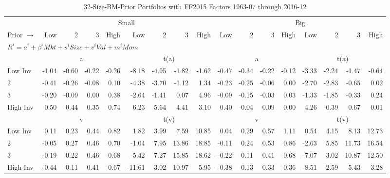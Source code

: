 
\begin{table}[!ht]
\centering
\caption{32-Size-BM-Prior Portfolios with FF2015 Factors 1963-07 through 2016-12}
\begin{tabular}{lrrrrrrrrrrrrrrrr}
  \toprule
    & \multicolumn{8}{c}{Small} & \multicolumn{8}{c}{Big} \\
      \cmidrule(r){2-9} \cmidrule(r){10-17}
    Prior $\rightarrow$ & Low & 2 & 3 & High & Low & 2 & 3 & High & Low & 2 & 3 & High & Low & 2 & 3 & High \\ 
  \midrule
  \multicolumn{17}{l}{$R^i=a^i+\beta^iMkt+s^iSize+v^iVal+m^iMom$} \\

  
    
      & \multicolumn{4}{c}{a} & \multicolumn{4}{c}{t(a)}
    
      & \multicolumn{4}{c}{a} & \multicolumn{4}{c}{t(a)}
    
    \\
      \cmidrule(r){2-5} \cmidrule(r){6-9} \cmidrule(r){10-13} \cmidrule(r){14-17}

    Low Inv   & -1.04  & -0.60  & -0.22  & -0.26  & -8.18  & -4.95  & -1.82  & -1.62  & -0.47  & -0.34  & -0.22  & -0.12  & -3.33  & -2.24  & -1.47  & -0.64  \\
           2  & -0.41  & -0.26  & -0.08  & 0.10  & -4.38  & -3.70  & -1.12  & 1.34  & -0.23  & -0.25  & -0.06  & 0.00  & -2.70  & -2.83  & -0.65  & 0.02  \\
           3  & -0.20  & -0.09  & 0.00  & 0.38  & -2.64  & -1.41  & 0.07  & 4.96  & -0.09  & -0.15  & -0.03  & 0.03  & -1.33  & -1.85  & -0.33  & 0.24  \\
    High Inv  & 0.50  & 0.44  & 0.35  & 0.74  & 6.23  & 5.64  & 4.41  & 3.10  & 0.40  & -0.04  & 0.09  & 0.00  & 4.26  & -0.39  & 0.67  & 0.01  \\

  
    
      & \multicolumn{4}{c}{v} & \multicolumn{4}{c}{t(v)}
    
      & \multicolumn{4}{c}{v} & \multicolumn{4}{c}{t(v)}
    
    \\
      \cmidrule(r){2-5} \cmidrule(r){6-9} \cmidrule(r){10-13} \cmidrule(r){14-17}

    Low Inv   & 0.11  & 0.23  & 0.44  & 0.82  & 1.82  & 3.99  & 7.59  & 10.85  & 0.04  & 0.29  & 0.57  & 1.11  & 0.54  & 4.15  & 8.13  & 12.73  \\
           2  & -0.05  & 0.27  & 0.46  & 0.70  & -1.04  & 7.95  & 13.86  & 18.85  & -0.11  & 0.24  & 0.53  & 0.86  & -2.63  & 5.85  & 11.73  & 16.54  \\
           3  & -0.19  & 0.22  & 0.46  & 0.68  & -5.42  & 7.27  & 15.85  & 18.62  & -0.22  & 0.11  & 0.41  & 0.68  & -7.07  & 3.02  & 10.87  & 12.50  \\
    High Inv  & -0.44  & 0.11  & 0.41  & 0.67  & -11.61  & 3.02  & 10.97  & 5.95  & -0.38  & 0.13  & 0.33  & 0.36  & -8.51  & 2.59  & 5.43  & 3.28  \\


\end{tabular}
\end{table}
